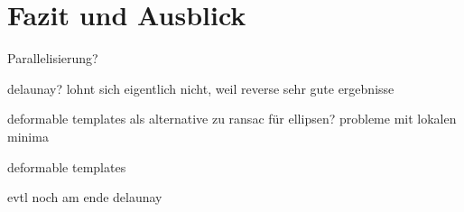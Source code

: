 \chapter{Fazit und Ausblick}
Parallelisierung?

delaunay? lohnt sich eigentlich nicht, weil reverse sehr gute ergebnisse

deformable templates als alternative zu ransac für ellipsen?  probleme mit lokalen minima



deformable templates

evtl noch am ende delaunay